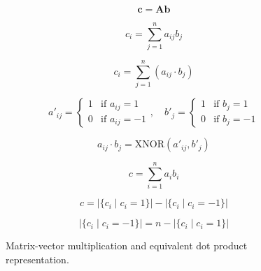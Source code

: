 \documentclass[conference]{IEEEtran}
\begin{document}
\begin{figure}[t]
    \centering
    \begin{equation}
    \mathbf{c} = \mathbf{A} \mathbf{b}
    \label{eq:matrix_vector_multiplication}
    \end{equation}

    \begin{equation}
    c_i = \sum_{j=1}^n a_{ij} b_j
    \label{eq:dot_product}
    \end{equation}

    \begin{equation}
    c_i = \sum_{j=1}^n (a_{ij} \cdot b_j)
    \label{eq:component_wise_dot}
    \end{equation}

    \begin{equation}
    a'_{ij} = \begin{cases}
    1 & \text{if } a_{ij} = 1 \\
    0 & \text{if } a_{ij} = -1
    \end{cases}, \quad
    b'_j = \begin{cases}
    1 & \text{if } b_j = 1 \\
    0 & \text{if } b_j = -1
    \end{cases}
    \label{eq:mapping}
    \end{equation}

    \begin{equation}
    a_{ij} \cdot b_j = \text{XNOR}(a'_{ij}, b'_j)
    \label{eq:xnor}
    \end{equation}

    \caption{Matrix-vector multiplication and equivalent dot product representation.}
    \label{fig:matrix_vector_multiplication}


    \centering
    \begin{equation}
    c = \sum_{i=1}^n a_i b_i
    \label{eq:dot_product_sum}
    \end{equation}

    \begin{equation}
    c = \left|\{c_i \mid c_i = 1\}\right| - \left|\{c_i \mid c_i = -1\}\right|
    \label{eq:dot_product_count}
    \end{equation}

    \begin{equation}
    |\{c_i \mid c_i = -1\}| = n - |\{c_i \mid c_i = 1\}|
    \label{eq:negative_count}
    \end{equation}


\end{figure}
\end{document}
